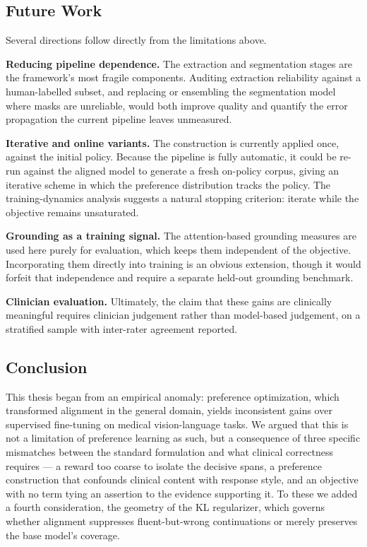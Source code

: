 \subsection{Future Work}
\label{sec:con:future}

Several directions follow directly from the limitations above.

\textbf{Reducing pipeline dependence.} The extraction and segmentation stages are the framework's most fragile components. Auditing extraction reliability against a human-labelled subset, and replacing or ensembling the segmentation model where masks are unreliable, would both improve quality and quantify the error propagation the current pipeline leaves unmeasured.

\textbf{Iterative and online variants.} The construction is currently applied once, against the initial policy. Because the pipeline is fully automatic, it could be re-run against the aligned model to generate a fresh on-policy corpus, giving an iterative scheme in which the preference distribution tracks the policy. The training-dynamics analysis suggests a natural stopping criterion: iterate while the objective remains unsaturated.

\textbf{Grounding as a training signal.} The attention-based grounding measures are used here purely for evaluation, which keeps them independent of the objective. Incorporating them directly into training is an obvious extension, though it would forfeit that independence and require a separate held-out grounding benchmark.

\textbf{Clinician evaluation.} Ultimately, the claim that these gains are clinically meaningful requires clinician judgement rather than model-based judgement, on a stratified sample with inter-rater agreement reported.

\subsection{Conclusion}
\label{sec:con:conclusion}

This thesis began from an empirical anomaly: preference optimization, which transformed alignment in the general domain, yields inconsistent gains over supervised fine-tuning on medical vision-language tasks. We argued that this is not a limitation of preference learning as such, but a consequence of three specific mismatches between the standard formulation and what clinical correctness requires --- a reward too coarse to isolate the decisive spans, a preference construction that confounds clinical content with response style, and an objective with no term tying an assertion to the evidence supporting it. To these we added a fourth consideration, the geometry of the KL regularizer, which governs whether alignment suppresses fluent-but-wrong continuations or merely preserves the base model's coverage.

